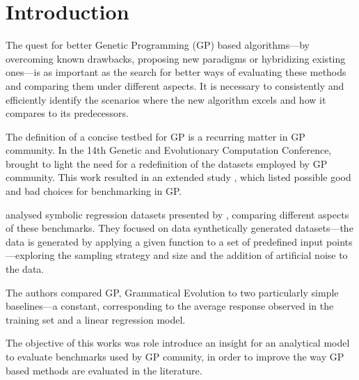 \section{Introduction}

The quest for better Genetic Programming (GP) based algorithms---by overcoming known drawbacks, proposing new paradigms or hybridizing existing ones---is as important as the search for better ways of evaluating these methods and comparing them under different aspects. It is necessary to consistently and efficiently identify the scenarios where the new algorithm excels and how it compares to its predecessors.

The definition of a concise testbed for GP is a recurring matter in GP community. In the 14th Genetic and Evolutionary Computation Conference, \citet{mcdermott2012genetic} brought to light the need for a redefinition of the datasets employed by GP community. This work resulted in an extended study \cite{white2013better}, which listed possible good and bad choices for benchmarking in GP.

\citet{nicolau2015guidelines} analysed symbolic regression datasets presented by \citet{mcdermott2012genetic}, comparing different aspects of these benchmarks. They focused on data synthetically generated datasets---the data is generated by applying a given function to a set of predefined input points---exploring the sampling strategy and size and the addition of artificial noise to the data. 

The authors compared GP, Grammatical Evolution to two particularly simple baselines---a constant, corresponding to the average response observed in the training set and a linear regression model. 





The objective of this works was role introduce an insight for an analytical model to evaluate benchmarks used by GP comunity, in order to improve the way GP based methods are evaluated in the literature.


